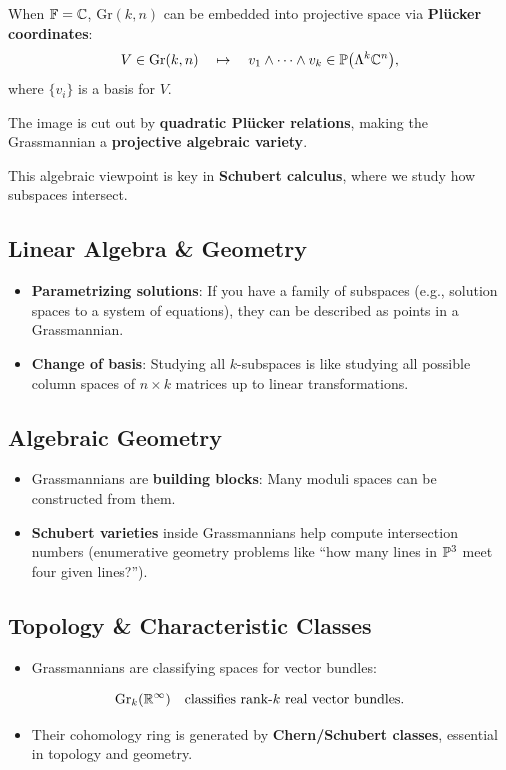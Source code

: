 \documentclass{amsart}
\let\originalmathbb\mathbb
\renewcommand{\mathbb}[1]{%
    \ifstrequal{#1}{1}{\mathbbm{#1}}{\originalmathbb{#1}}%
}
\theoremstyle{plain}
\theoremstyle{definition}
\theoremstyle{remark}
\begin{document}
When $\mathbb{F} = \mathbb{C}$, $\mathrm{Gr}(k, n)$ can be embedded into projective space via \textbf{Plücker coordinates}:
\[
V \in \mathrm{Gr}(k, n) \quad \mapsto \quad v_1 \wedge \cdots \wedge v_k \in \mathbb{P}\big(\Lambda^k \mathbb{C}^n\big),
\]
where $\{v_i\}$ is a basis for $V$.

The image is cut out by \textbf{quadratic Plücker relations}, making the Grassmannian a \textbf{projective algebraic variety}.

This algebraic viewpoint is key in \textbf{Schubert calculus}, where we study how subspaces intersect.

\subsection{\textbf{Linear Algebra \& Geometry}}

\begin{itemize}
	\item \textbf{Parametrizing solutions}: If you have a family of subspaces (e.g., solution spaces to a system of equations), they can be described as points in a Grassmannian.
	\item \textbf{Change of basis}: Studying all $k$-subspaces is like studying all possible column spaces of $n \times k$ matrices up to linear transformations.
\end{itemize}

\subsection{\textbf{Algebraic Geometry}}

\begin{itemize}
	\item Grassmannians are \textbf{building blocks}: Many moduli spaces can be constructed from them.
	\item \textbf{Schubert varieties} inside Grassmannians help compute intersection numbers (enumerative geometry problems like “how many lines in $\mathbb{P}^3$ meet four given lines?”).
\end{itemize}

\subsection{\textbf{Topology \& Characteristic Classes}}

\begin{itemize}
	\item Grassmannians are classifying spaces for vector bundles:
\end{itemize}
\[
\mathrm{Gr}_k(\mathbb{R}^\infty) \quad\text{classifies rank-\(k\) real vector bundles}.
\]
\begin{itemize}
	\item Their cohomology ring is generated by \textbf{Chern/Schubert classes}, essential in topology and geometry.
\end{itemize}
\end{document}
